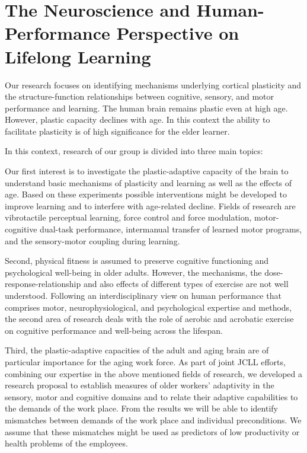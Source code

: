 \section{The Neuroscience and Human-Performance Perspective on
Lifelong Learning} 

  Our research focuses on identifying mechanisms underlying cortical plasticity and the structure-function relationships between cognitive, sensory, and motor performance and learning. The human brain remains plastic even at high age. However, plastic capacity declines with age. In this context the ability to facilitate plasticity is of high significance for the elder learner.
  
 In this context, research of our group is divided into three main topics:

 Our first interest is to investigate the plastic-adaptive capacity of the brain to understand basic mechanisms of plasticity and learning as well as the effects of age. Based on these experiments possible interventions might be developed to improve learning and to interfere with age-related decline. Fields of research are vibrotactile perceptual learning, force control and force modulation, motor-cognitive dual-task performance, intermanual transfer of learned motor programs, and the sensory-motor coupling during learning.
	
 Second, physical fitness is assumed to preserve cognitive functioning and psychological well-being in older adults. However, the mechanisms, the dose-response-relationship and also effects of different types of exercise are not well understood. Following an interdisciplinary view on human performance that comprises motor, neurophysiological, and psychological expertise and methods, the second area of research deals with the role of aerobic and acrobatic exercise on cognitive performance and well-being across the lifespan.
	
 Third, the plastic-adaptive capacities of the adult and aging brain are of particular importance for the aging work force. As part of joint JCLL efforts, combining our expertise in the above mentioned fields of research, we developed a research proposal to establish measures of older workers' adaptivity in the sensory, motor and cognitive domains and to relate their adaptive capabilities to the demands of the work place. From the results we will be able to identify mismatches between demands of the work place and individual preconditions. We assume that these mismatches might be used as predictors of low productivity or health problems of the employees.

